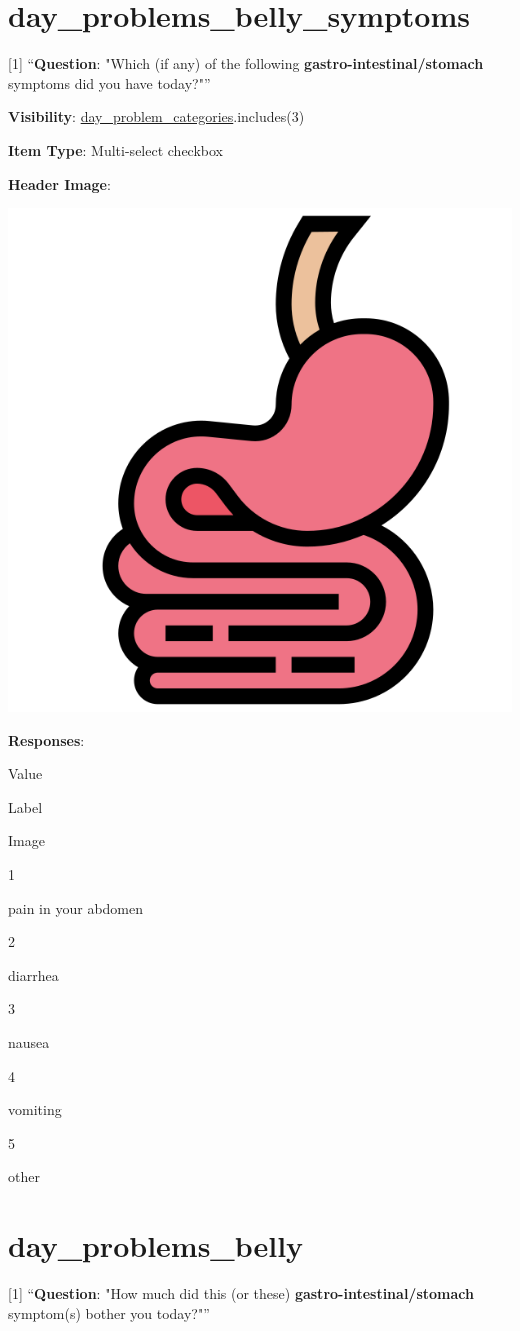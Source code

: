 \documentclass[]{book}
\begin{document}
\hypertarget{day_problems_belly_symptoms}{%
\section{day\_problems\_belly\_symptoms}\label{day_problems_belly_symptoms}}

{[}1{]} ``\textbf{Question}: "Which (if any) of the following \textbf{gastro-intestinal/stomach} symptoms did you have today?"''

\textbf{Visibility}: \protect\hyperlink{day_problem_categories}{day\_problem\_categories}.includes(3)

\textbf{Item Type}: Multi-select checkbox

\textbf{Header Image}:

\begin{flushleft}\includegraphics[width=0.33\linewidth]{downloadFigs4latex_NIMH_Applet_Codebook/day_problems_belly_symptoms_headerImg} \end{flushleft}

\textbf{Responses}:

Value

Label

Image

1

pain in your abdomen

2

diarrhea

3

nausea

4

vomiting

5

other

\hypertarget{day_problems_belly}{%
\section{day\_problems\_belly}\label{day_problems_belly}}

{[}1{]} ``\textbf{Question}: "How much did this (or these) \textbf{gastro-intestinal/stomach} symptom(s) bother you today?"''
\end{document}
